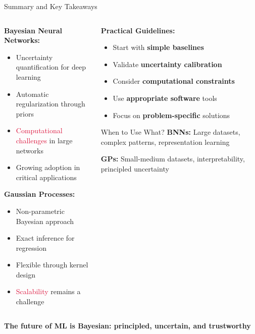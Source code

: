\documentclass[aspectratio=169,11pt]{beamer}
\begin{document}
\begin{frame}{Summary and Key Takeaways}
\begin{columns}
\begin{column}{0.5\textwidth}
\textbf{Bayesian Neural Networks:}
\begin{itemize}
\item \textcolor{forest}{Uncertainty quantification} for deep learning
\item \textcolor{forest}{Automatic regularization} through priors
\item \textcolor{crimson}{Computational challenges} in large networks
\item \textcolor{forest}{Growing adoption} in critical applications
\end{itemize}

\vspace{0.3cm}
\textbf{Gaussian Processes:}
\begin{itemize}
\item \textcolor{forest}{Non-parametric} Bayesian approach
\item \textcolor{forest}{Exact inference} for regression
\item \textcolor{forest}{Flexible} through kernel design
\item \textcolor{crimson}{Scalability} remains a challenge
\end{itemize}
\end{column}
\begin{column}{0.5\textwidth}
\textbf{Practical Guidelines:}
\begin{itemize}
\item Start with \textbf{simple baselines}
\item Validate \textbf{uncertainty calibration}
\item Consider \textbf{computational constraints}
\item Use \textbf{appropriate software} tools
\item Focus on \textbf{problem-specific} solutions
\end{itemize}

\vspace{0.3cm}
\begin{block}{When to Use What?}
\textbf{BNNs:} Large datasets, complex patterns, representation learning

\textbf{GPs:} Small-medium datasets, interpretability, principled uncertainty
\end{block}
\end{column}
\end{columns}

\vspace{0.5cm}
\begin{center}
\textcolor{navyblue}{\Large \textbf{The future of ML is Bayesian: principled, uncertain, and trustworthy}}
\end{center}
\end{frame}
\end{document}
